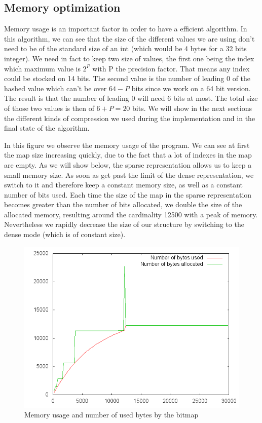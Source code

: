 \documentclass{article}
\begin{document}
\subsection{Memory optimization}
Memory usage is an important factor in order to have a efficient
algorithm. In this algorithm, we can see that the size of the
different values we are using don't need to be of the standard size of
an int (which would be 4 bytes for a 32 bits integer). We need in fact
to keep two size of values, the first one being the index which
maximum value is $2^{P}$ with P the precision factor. That means any
index could be stocked on 14 bits. The second value is the number of
leading 0 of the hashed value which can't be over $64-P$ bits since we
work on a 64 bit version. The result is that the number of leading 0
will need 6 bits at most. The total size of those two values is then
of $6+P = 20$ bits. We will show in the next sections the different
kinds of compression we used during the implementation and in the
final state of the algorithm.

In this figure we observe the memory usage of the program. We can see
at first the map size increasing quickly, due to the fact that a lot
of indexes in the map are empty. As we will show below, the sparse
representation allows us to keep a small memory size. As soon as get
past the limit of the dense representation, we switch to it and
therefore keep a constant memory size, as well as a constant number of
bits used. Each time the size of the map in the sparse representation
becomes greater than the number of bits allocated, we double the size
of the allocated memory, resulting around the cardinality 12500 with a
peak of memory. Nevertheless we rapidly decrease the size of our
structure by switching to the dense mode (which is of constant
size).\\
 
 
\begin{center}
\begin{figure}[h]
\includegraphics[scale=0.7]{plot_memoryUsage.png}
\caption{Memory usage and number of used bytes by the bitmap}
\end{figure}
\end{center}
\end{document}
